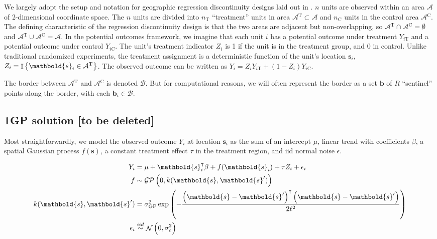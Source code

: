 \documentclass[letter]{article}
\DeclareMathOperator{\Ind}{\mathbb{I}}
\DeclareMathOperator{\normal}{\mathcal{N}}
\newcommand{\gp}{\mathcal{GP}}
\newcommand{\trans}{^{\intercal}}
\newcommand{\area}{\mathcal{A}}
\newcommand{\treat}{\mathrm{T}}
\newcommand{\ctrol}{\mathrm{C}}
\newcommand{\treatind}{Z}
\newcommand{\treatarea}{\area{}^{\treat}}
\newcommand{\ctrolarea}{\area{}^{\ctrol}}
\newcommand{\sigmaf}{\sigma_{\mathrm{GP}}}
\newcommand{\svec}{\mathbold{s}}
\newcommand{\iid}{iid}
\newcommand{\boundary}{\mathcal{B}}
\newcommand{\sentinels}{\bm{b}}
\newcommand{\numsent}{R}
\renewcommand{\cite}[1]{\citep{#1}}
\begin{document}
We largely adopt the setup and notation for geographic regression discontinuity designs laid out in \cite{keele_titiunik_2015}.
\(n\) units are observed within an area \(\area\) of 2-dimensional coordinate space.
The \(n\) units are divided into \(n_\treat\) ``treatment'' units in area \(\treatarea \subset \area\)
and \(n_\ctrol\) units in the control area \(\ctrolarea\).
The defining characteristic of the regression discontinuity design is that the two areas are adjacent but non-overlapping, so \(\treatarea \cap \ctrolarea = \emptyset\) and \(\treatarea \cup \ctrolarea = \area\).
In the potential outcomes framework, we imagine that each unit \(i\) has a potential outcome under treatment \(Y_{i\treat}\) and a potential outcome under control \(Y_{i\ctrol}\).
The unit's treatment indicator \(\treatind_i\) is 1 if the unit is in the treatment group, and 0 in control.
Unlike traditional randomized experiments, the treatment assignment is a deterministic function of the unit's location \(\svec_i\), \(\treatind_i = \Ind\cbr{\svec_i \in \treatarea}\).
The observed outcome can be written as \(Y_i = \treatind_i Y_{i\treat} + (1 - \treatind_i) Y_{i\ctrol}\).

The border between \(\treatarea\) and \(\ctrolarea\) is denoted \(\boundary\).
But for computational reasons, we will often represent the border as a set \(\sentinels\) of \(\numsent\) ``sentinel'' points along the border, with each \(\sentinels_i \in \boundary\).
    


    	\subsection{1GP solution {[}to be deleted{]}}\label{gp-solution-to-be-deleted}

Most straightforwardly, we model the observed outcome \(Y_i\) at location \(\svec_i\) as the sum of an intercept \(\mu\), linear trend with coefficients \(\beta\), a spatial Gaussian process \(f(\svec)\), a constant treatment effect \(\tau\) in the treatment region, and iid normal noise \(\epsilon\).

\begin{equation}\begin{split}
Y_i &= \mu+\svec_i\trans\beta + f(\svec_i) + \tau \treatind_i + \epsilon_i \\
f &\sim \gp\del{0, k(\svec, \svec')} \\
k(\svec,\svec') &= \sigmaf^2 \exp\del{ - \frac{\del{\svec-\svec'}\trans\del{\svec-\svec'}}{2 \ell^2}} \\
\epsilon_i &\overset{\iid}{\sim} \normal\del{0,\sigma_\epsilon^2}
\end{split}\end{equation}
\end{document}
